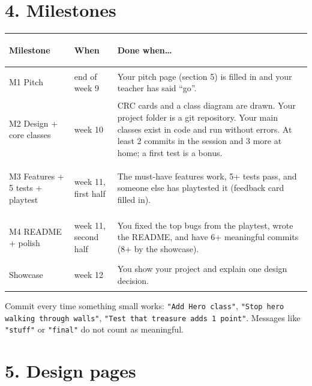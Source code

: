\documentclass[level=3]{kidscode}
\begin{document}
\section{4. Milestones}

\begin{longtable}{@{}>{\bfseries\raggedright\arraybackslash}p{3.0cm}>{\raggedright\arraybackslash}p{2.6cm}p{\dimexpr\linewidth-5.6cm-4\tabcolsep}@{}}
\toprule
\rowcolor{kcaccent!15} Milestone & When & Done when\ldots\\ \midrule\endhead
\bottomrule\endfoot
M1 Pitch & end of week 9 & Your pitch page (section 5) is filled in and your teacher has said
\enquote{go}.\\ \midrule
M2 Design + core classes & week 10 & CRC cards and a class diagram are drawn. Your project folder is a git
repository. Your main classes exist in code and run without errors. At least 2 commits in the
session and 3 more at home; a first test is a bonus.\\ \midrule
M3 Features + 5 tests + playtest & week 11, first half & The must-have features work, 5+ tests
pass, and someone else has playtested it (feedback card filled in).\\ \midrule
M4 README + polish & week 11, second half & You fixed the top bugs from the playtest, wrote the
README, and have 6+ meaningful commits (8+ by the showcase).\\ \midrule
Showcase & week 12 & You show your project and explain one design decision.\\
\end{longtable}

\begin{tip}
Commit every time something small works: \texttt{"Add Hero class"}, \texttt{"Stop hero walking
through walls"}, \texttt{"Test that treasure adds 1 point"}. Messages like \texttt{"stuff"} or
\texttt{"final"} do not count as meaningful.
\end{tip}

\section{5. Design pages}
\end{document}
